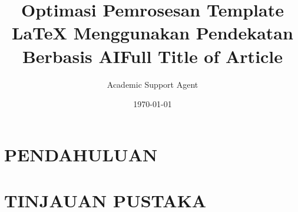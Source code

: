 \documentclass{clear2022}
\title{Optimasi Pemrosesan Template LaTeX Menggunakan Pendekatan Berbasis AI}
\author{Academic Support Agent}
\date{\today}
\begin{document}
\maketitle

\begin{abstract}

\end{abstract}

\chapter{PENDAHULUAN}


\chapter{TINJAUAN PUSTAKA}




\title[Short Title]{Full Title of Article}
\usepackage{times}



\end{document}
